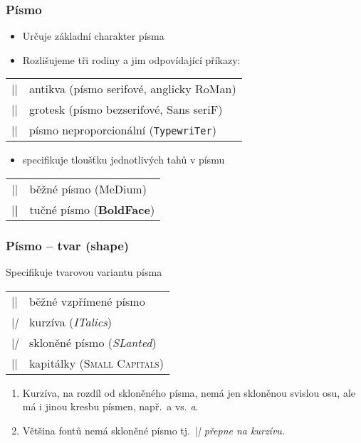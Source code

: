 \begin{frame}[fragile]
	\frametitle{Písmo}
	\begin{itemize}
		\item Určuje základní charakter písma
		\item Rozlišujeme tři rodiny a jim odpovídající příkazy:
	\end{itemize}
	\begin{center}
		\begin{tabular}{cl}
			|\rmfamily| & antikva (písmo serifové, anglicky \textrm{RoMan})\\
			|\sffamily| & grotesk (písmo bezserifové, \textsf{Sans seriF})\\
			|\ttfamily| & písmo neproporcionální (\texttt{TypewriTer})\\
		\end{tabular}
	\end{center}
	\begin{itemize}
		\item specifikuje tloušťku jednotlivých tahů v písmu
	\end{itemize}
	\begin{center}
		\begin{tabular}{cl}
			|\mdseries| & běžné písmo (MeDium)\\
			|\bfseries| & tučné písmo (\textbf{BoldFace})\\
		\end{tabular}
	\end{center}
\end{frame}


\begin{frame}[fragile]
	\frametitle{Písmo -- tvar (shape)}
	Specifikuje tvarovou variantu písma
	\begin{center}
		\begin{tabular}{cl}
			|\upshape| & běžné vzpřímené písmo\\
			|\itshape| & kurzíva (\textit{ITalics})\\
			|\slshape| & skloněné písmo (\textsl{SLanted})\\
			|\scshape| & kapitálky (\textsc{Small Capitals})\\
		\end{tabular}
	\end{center}
	\begin{remark}
		\begin{enumerate}
			\item Kurzíva, na rozdíl od skloněného písma, nemá jen skloněnou svislou osu, ale má i jinou kresbu písmen, např.\ \textrm{\huge{}a} vs. \textit{\huge{}a}.
			\item Většina fontů nemá skloněné písmo tj.\ |\slshape| přepne na kurzívu.
		\end{enumerate}
	\end{remark}
\end{frame}


